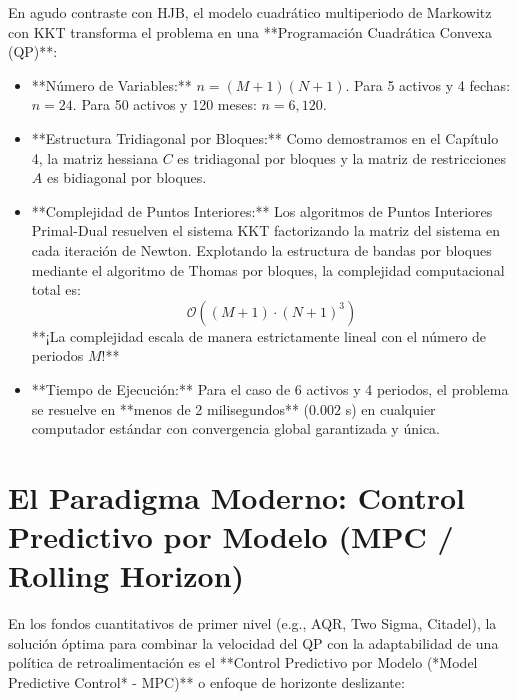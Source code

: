 \documentclass[11pt,a4paper]{report}
\numberwithin{equation}{chapter}
\begin{document}
En agudo contraste con HJB, el modelo cuadrático multiperiodo de Markowitz con KKT transforma el problema en una **Programación Cuadrática Convexa (QP)**:
\begin{itemize}[leftmargin=2em]
    \item **Número de Variables:** $n = (M+1)(N+1)$. Para 5 activos y 4 fechas: $n = 24$. Para 50 activos y 120 meses: $n = 6{,}120$.
    \item **Estructura Tridiagonal por Bloques:** Como demostramos en el Capítulo 4, la matriz hessiana $C$ es tridiagonal por bloques y la matriz de restricciones $A$ es bidiagonal por bloques.
    \item **Complejidad de Puntos Interiores:** Los algoritmos de Puntos Interiores Primal-Dual resuelven el sistema KKT factorizando la matriz del sistema en cada iteración de Newton. Explotando la estructura de bandas por bloques mediante el algoritmo de Thomas por bloques, la complejidad computacional total es:
    \begin{equation}
        \boxed{\mathcal{O}\left( (M+1) \cdot (N+1)^3 \right)}
    \end{equation}
    **¡La complejidad escala de manera estrictamente lineal con el número de periodos $M$!**
    \item **Tiempo de Ejecución:** Para el caso de 6 activos y 4 periodos, el problema se resuelve en **menos de 2 milisegundos** ($0.002$ s) en cualquier computador estándar con convergencia global garantizada y única.
\end{itemize}

\section{El Paradigma Moderno: Control Predictivo por Modelo (MPC / Rolling Horizon)}

En los fondos cuantitativos de primer nivel (e.g., AQR, Two Sigma, Citadel), la solución óptima para combinar la velocidad del QP con la adaptabilidad de una política de retroalimentación es el **Control Predictivo por Modelo (*Model Predictive Control* - MPC)** o enfoque de horizonte deslizante:
\end{document}
